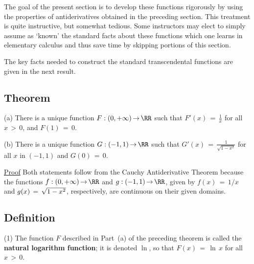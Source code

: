         The goal of the present section is to develop these functions rigorously by using the properties of antiderivatives obtained in the preceding section.
    This treatment is quite instructive, but somewhat tedious. Some instructors may elect to simply assume as `known'
    the standard facts about these functions which one learns in elementary calculus and thus save time by skipping portions of this section.

\V

        The key facts needed to construct the standard transcendental functions are given in the next result.

\V

             \subsection{\small{\bf Theorem}}
            \label{ThmE45.127A}

\V

\hspace*{\parindent}(a) There is a unique function $F:(0,+{\infty}) \,{\rightarrow}\, {\RR}$
    such that ${\displaystyle F'(x) \,=\, \frac{1}{x}}$ for all $x\,>\,0$, and $F(1) \,=\, 0$.

\V

        (b) There is a unique function $G:(-1,1) \,{\rightarrow}\, {\RR}$ such that
    ${\displaystyle G'(x) \,=\, \frac{1}{\sqrt{1-x^{2}}}}$ for all $x$ in $(-1,1)$ and $G(0) \,=\, 0$.

\V

        \underline{Proof} Both statements follow from the Cauchy Antiderivative Theorem because the functions $f:(0,+{\infty}) \,{\rightarrow}\, {\RR}$ and
     $g:(-1,1) \,{\rightarrow}\, {\RR}$, given by $f(x) \,=\, 1/x$ and $g(x) \,=\, \/\sqrt{1-x^{2}}$, respectively, are continuous on their given domains.

\VV


             \subsection{\small{\bf Definition}}
             \label{DefE45.127B}

\V

\hspace*{\parindent}(1) The function $F$ described in Part~(a) of the preceding theorem is called the {\bf natural logarithm function}; it is denoted ${\ln}$, so that $F(x) \,=\, {\ln}\,x$ for all $x\,>\,0$.

